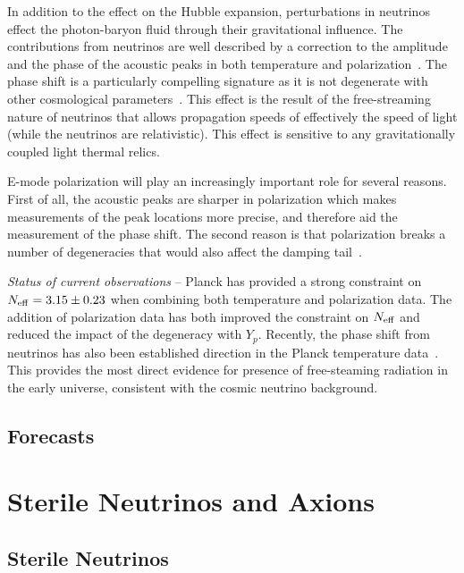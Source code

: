 In addition to the effect on the Hubble expansion, perturbations in neutrinos effect the photon-baryon fluid through their gravitational influence.  The contributions from neutrinos are well described by a correction to the amplitude and the phase of the acoustic peaks in both temperature and polarization~\cite{Bashinsky:2003tk}.  The phase shift is a particularly compelling signature as it is not degenerate with other cosmological parameters~\cite{Bashinsky:2003tk,Baumann:2015rya}.  This effect is the result of the free-streaming nature of neutrinos that allows propagation speeds of effectively the speed of light (while the neutrinos are relativistic).  This effect is sensitive to any gravitationally coupled light thermal relics.

E-mode polarization will play an increasingly important role for several reasons.  First of all, the acoustic peaks are sharper in polarization which makes measurements of the peak locations more precise, and therefore aid the measurement of the phase shift.  The second reason is that polarization breaks a number of degeneracies that would also affect the damping tail~\cite{Baumann:2015rya}.

{\it Status of current observations} -- Planck has provided a strong constraint on $N_{\rm eff} = 3.15 \pm 0.23$ when combining both temperature and polarization data.  The addition of polarization data has both improved the constraint on $N_{\rm eff}$ and reduced the impact of the degeneracy with $Y_p$.  Recently, the phase shift from neutrinos has also been established direction in the Planck temperature data~\cite{Follin:2015hya}.  This provides the most direct evidence for presence of free-steaming radiation in the early universe, consistent with the cosmic neutrino background.


\subsection{Forecasts}




\section{Sterile Neutrinos and Axions}
\subsection{Sterile Neutrinos}

